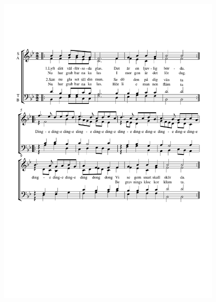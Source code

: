 \documentclass[a6paper,11pt]{article}
\begin{document}
\setlength{\oddsidemargin}{-0.47in}
\begin{center}
\end{center}
\vspace{-40pt}
\begin{figure}[!h]
\centering
\includegraphics[width=\textwidth]{lyft-ditt-valforsedda}
\end{figure}
\end{document}
